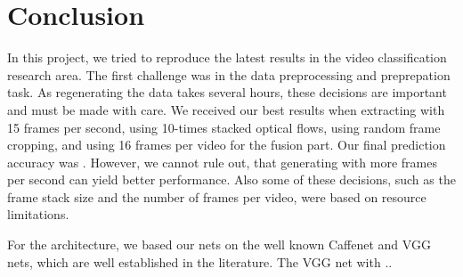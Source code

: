 \section{Conclusion}
\label{sec:conclusion}

In this project, we tried to reproduce the latest results in the video classification research area.
The first challenge was in the data preprocessing and preprepation task.
As regenerating the data takes several hours, these decisions are important and must be made with care.
We received our best results when extracting with 15 frames per second, using 10-times stacked optical flows, using random frame cropping, and using 16 frames per video for the fusion part.
Our final prediction accuracy was .
However, we cannot rule out, that generating with more frames per second can yield better performance.
Also some of these decisions, such as the frame stack size and the number of frames per video, were based on resource limitations.

For the architecture, we based our nets on the well known Caffenet and VGG nets, which are well established in the literature.
The VGG net with  ..